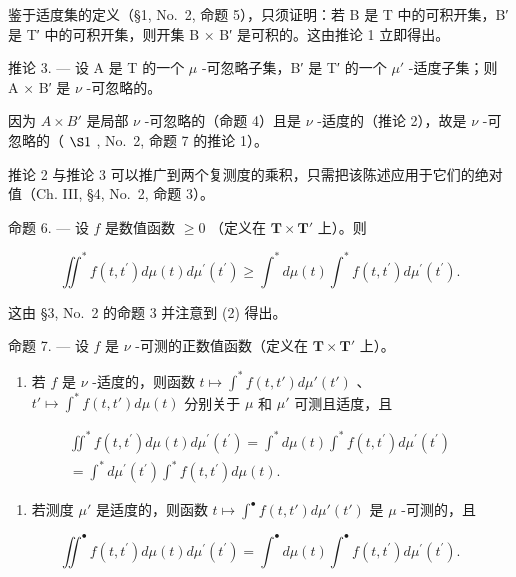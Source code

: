 鉴于适度集的定义（§1, No.~2, 命题 5），只须证明：若 B 是 T 中的可积开集，B′ 是 T′ 中的可积开集，则开集 B × B′ 是可积的。这由推论 1 立即得出。

推论 3. --- 设 A 是 T 的一个 \(\mu\) -可忽略子集，B′ 是 T′ 的一个 \(\mu'\) -适度子集；则 A × B′ 是 \(\nu\) -可忽略的。

因为 \(A \times B'\) 是局部 \(\nu\) -可忽略的（命题 4）且是 \(\nu\) -适度的（推论 2），故是 \(\nu\) -可忽略的（ \(\S1\) , No.~2, 命题 7 的推论 1）。

推论 2 与推论 3 可以推广到两个复测度的乘积，只需把该陈述应用于它们的绝对值（Ch. III, §4, No.~2, 命题 3）。

命题 6. --- 设 \(f\) 是数值函数 \(\geqslant 0\) （定义在 \(\mathbf{T} \times \mathbf{T}'\) 上）。则

\[
\iint^ {*} f (t, t ^ {\prime}) d \mu (t) d \mu^ {\prime} (t ^ {\prime}) \geqslant \int^ {*} d \mu (t) \int^ {*} f (t, t ^ {\prime}) d \mu^ {\prime} (t ^ {\prime}).
\]

这由 §3, No.~2 的命题 3 并注意到 (2) 得出。

命题 7. --- 设 \(f\) 是 \(\nu\) -可测的正数值函数（定义在 \(\mathbf{T} \times \mathbf{T}'\) 上）。

\begin{enumerate}
\def\labelenumi{\alph{enumi})}
\tightlist
\item
  若 \(f\) 是 \(\nu\) -适度的，则函数 \(t \mapsto \int^{*} f(t, t') d\mu'(t')\) 、\(t' \mapsto \int^{*} f(t, t') d\mu(t)\) 分别关于 \(\mu\) 和 \(\mu'\) 可测且适度，且
\end{enumerate}

\[
\begin{array}{r} \iint^ {*} f (t, t ^ {\prime}) d \mu (t) d \mu^ {\prime} (t ^ {\prime}) = \int^ {*} d \mu (t) \int^ {*} f (t, t ^ {\prime}) d \mu^ {\prime} (t ^ {\prime}) \\ = \int^ {*} d \mu^ {\prime} (t ^ {\prime}) \int^ {*} f (t, t ^ {\prime}) d \mu (t). \end{array}\tag{7}
\]

\begin{enumerate}
\def\labelenumi{\alph{enumi})}
\setcounter{enumi}{1}
\tightlist
\item
  若测度 \(\mu'\) 是适度的，则函数 \(t \mapsto \int^{\bullet} f(t, t') d\mu'(t')\) 是 \(\mu\) -可测的，且
\end{enumerate}

\[
\iint^ {\bullet} f (t, t ^ {\prime}) d \mu (t) d \mu^ {\prime} (t ^ {\prime}) = \int^ {\bullet} d \mu (t) \int^ {\bullet} f (t, t ^ {\prime}) d \mu^ {\prime} (t ^ {\prime}).\tag{8}
\]

